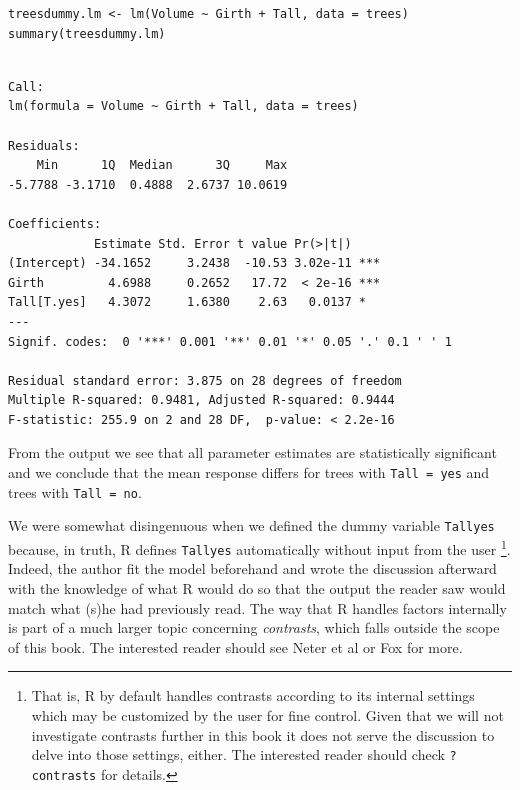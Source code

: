 \documentclass[captions=tableheading]{scrbook}
\begin{document}
\begin{verbatim}
treesdummy.lm <- lm(Volume ~ Girth + Tall, data = trees)
summary(treesdummy.lm)
\end{verbatim}


\begin{verbatim}

Call:
lm(formula = Volume ~ Girth + Tall, data = trees)

Residuals:
    Min      1Q  Median      3Q     Max 
-5.7788 -3.1710  0.4888  2.6737 10.0619 

Coefficients:
            Estimate Std. Error t value Pr(>|t|)    
(Intercept) -34.1652     3.2438  -10.53 3.02e-11 ***
Girth         4.6988     0.2652   17.72  < 2e-16 ***
Tall[T.yes]   4.3072     1.6380    2.63   0.0137 *  
---
Signif. codes:  0 '***' 0.001 '**' 0.01 '*' 0.05 '.' 0.1 ' ' 1 

Residual standard error: 3.875 on 28 degrees of freedom
Multiple R-squared: 0.9481,	Adjusted R-squared: 0.9444 
F-statistic: 255.9 on 2 and 28 DF,  p-value: < 2.2e-16
\end{verbatim}

From the output we see that all parameter estimates are statistically significant and we conclude that the mean response differs for trees with \texttt{Tall = yes} and trees with \texttt{Tall = no}.

\begin{rem}
We were somewhat disingenuous when we defined the dummy variable \texttt{Tallyes} because, in truth, \textsf{R} defines \texttt{Tallyes} automatically without input from the user
\footnote{That is, \textsf{R} by default handles contrasts according to its internal settings which may be customized by the user for fine control. Given that we will not investigate contrasts further in this book it does not serve the discussion to delve into those settings, either. The interested reader should check \texttt{?contrasts} for details.}. 
Indeed, the author fit the model beforehand and wrote the discussion afterward with the knowledge of what \textsf{R} would do so that the output the reader saw would match what (s)he had previously read. The way that \textsf{R} handles factors internally is part of a much larger topic concerning \emph{contrasts}, which falls outside the scope of this book. The interested reader should see Neter et al \cite{Neter1996} or Fox \cite{Fox1997} for more. 
\end{rem}
\end{document}
